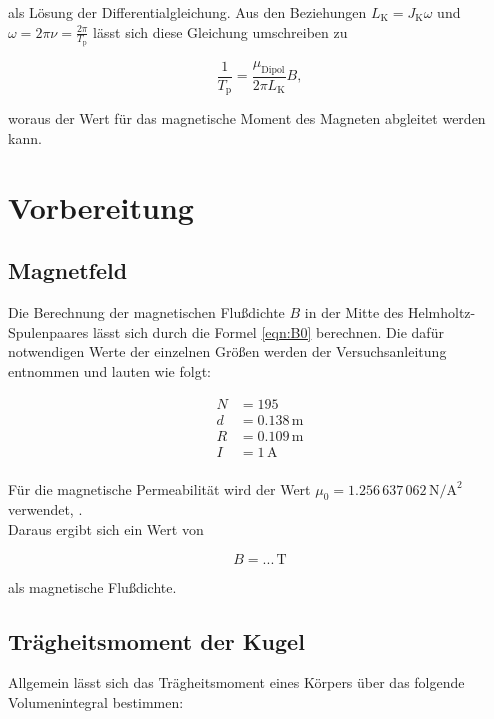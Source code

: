 \noindent als Lösung der Differentialgleichung. Aus den Beziehungen $L_\text{K} = J_\text{K}\omega$ und $\omega = 2\pi\nu
= \frac{2\pi}{T_\text{p}}$ lässt sich diese Gleichung umschreiben zu

\begin{equation}
\label{eqn:Praezession}
    \frac{1}{T_\text{p}} = \frac{\mu_\text{Dipol}}{2\pi{}L_\text{K}}B, 
\end{equation}

\noindent woraus der Wert für das magnetische Moment des Magneten abgleitet werden kann.

\section{Vorbereitung}

\subsection{Magnetfeld}
Die Berechnung der magnetischen Flußdichte $B$ in der Mitte des Helmholtz-Spulenpaares lässt sich durch die Formel 
\eqref{eqn:B0} berechnen. Die dafür notwendigen Werte der einzelnen Größen werden der Versuchsanleitung entnommen und
lauten wie folgt:

\begin{align*}
    N &= 195 \\
    d &= 0.138\,\unit{\meter} \\
    R &= 0.109\,\unit{\meter} \\
    I &= 1\,\unit{\ampere} \\
\end{align*}

\noindent Für die magnetische Permeabilität wird der Wert $\mu_0 = 1.256\,637\,062\,\unit{\newton\per\ampere\squared}$ 
verwendet, \cite{Magnetische_Feldkonstante}.\\

\noindent Daraus ergibt sich ein Wert von 

\begin{equation*}
    B = ...\,\unit{\tesla}
\end{equation*}

\noindent als magnetische Flußdichte.

\subsection{Trägheitsmoment der Kugel}

Allgemein lässt sich das Trägheitsmoment eines Körpers über das folgende Volumenintegral bestimmen:

